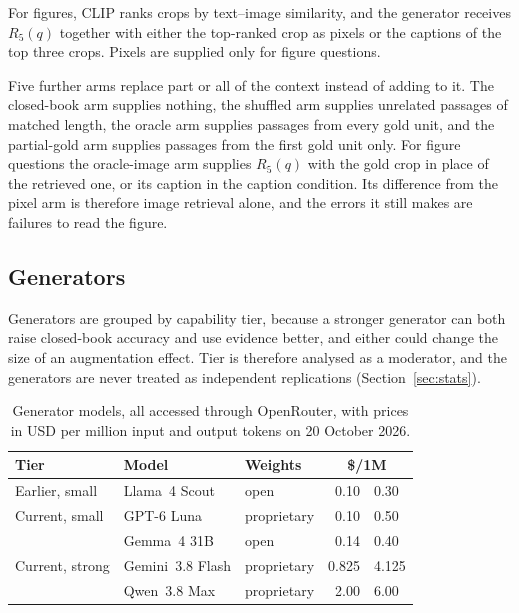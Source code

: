 \documentclass[preprint,12pt]{elsarticle}
\begin{document}
For figures, CLIP ranks crops by text--image similarity, and the generator
receives $R_5(q)$ together with either the top-ranked crop as pixels or the
captions of the top three crops. Pixels are supplied only for figure questions.

Five further arms replace part or all of the context instead of adding to
it. The closed-book arm supplies nothing, the shuffled arm supplies unrelated
passages of matched length, the oracle arm supplies passages from every gold
unit, and the partial-gold arm supplies passages from the first gold unit
only. For figure questions the oracle-image arm supplies $R_5(q)$ with the
gold crop in place of the retrieved one, or its caption in the caption
condition. Its difference from the pixel arm is therefore image retrieval
alone, and the errors it still makes are failures to read the figure.

\subsection{Generators}
\label{sec:generators}

Generators are grouped by capability tier, because a stronger generator can
both raise closed-book accuracy and use evidence better, and either could change
the size of an augmentation effect. Tier is therefore analysed as a moderator,
and the generators are never treated as independent replications
(Section~\ref{sec:stats}).

\begin{table}[t]
\caption{Generator models, all accessed through OpenRouter, with prices in USD
per million input and output tokens on 20 October 2026.}
\label{tab:models}
\centering
\footnotesize
\begin{tabular}{@{}lllr@{\,/\,}l@{}}
\toprule
Tier & Model & Weights & \multicolumn{2}{c}{\$/1M} \\
\midrule
Earlier, small & Llama~4 Scout         & open        & 0.10 & 0.30 \\
Current, small & GPT-6 Luna            & proprietary & 0.10 & 0.50 \\
               & Gemma~4 31B          & open        & 0.14 & 0.40 \\
Current, strong & Gemini~3.8 Flash     & proprietary & 0.825 & 4.125 \\
                & Qwen~3.8 Max         & proprietary & 2.00 & 6.00 \\
\bottomrule
\end{tabular}
\end{table}
\end{document}
